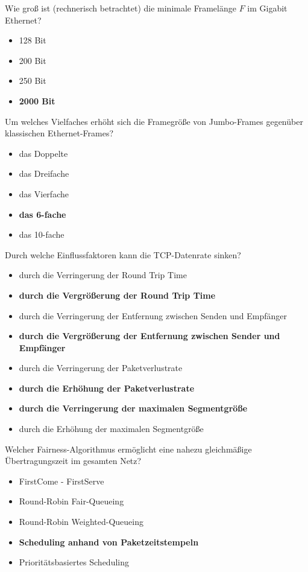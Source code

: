 \documentclass{article}
\begin{document}
	Wie groß ist (rechnerisch betrachtet) die minimale Framelänge $F$ im Gigabit Ethernet?
	\begin{itemize}
		\item 128 Bit
		\item 200 Bit
		\item 250 Bit
		\item \textbf{2000 Bit}
	\end{itemize}

	Um welches Vielfaches erhöht sich die Framegröße von Jumbo-Frames gegenüber klassischen Ethernet-Frames? 
	\begin{itemize}
		\item das Doppelte 
		\item das Dreifache 
		\item das Vierfache 
		\item \textbf{das 6-fache }
		\item das 10-fache 
	\end{itemize}

	Durch welche Einflussfaktoren kann die TCP-Datenrate sinken? 
	\begin{itemize}
		\item durch die Verringerung der Round Trip Time
		\item \textbf{durch die Vergrößerung der Round Trip Time}
		\item durch die Verringerung der Entfernung zwischen Senden und Empfänger
		\item \textbf{durch die Vergrößerung der Entfernung zwischen Sender und Empfänger}
		\item durch die Verringerung der Paketverlustrate
		\item \textbf{durch die Erhöhung der Paketverlustrate}
		\item \textbf{durch die Verringerung der maximalen Segmentgröße}
		\item durch die Erhöhung der maximalen Segmentgröße
	\end{itemize}

	Welcher Fairness-Algorithmus ermöglicht eine nahezu gleichmäßige Übertragungszeit im gesamten Netz? 
	\begin{itemize}
		\item FirstCome - FirstServe
		\item Round-Robin Fair-Queueing
		\item Round-Robin Weighted-Queueing 
		\item \textbf{Scheduling anhand von Paketzeitstempeln}
		\item Prioritätsbasiertes Scheduling
	\end{itemize}
\end{document}
